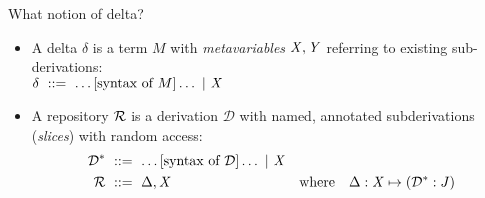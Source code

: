 \documentclass{beamer}
\theoremstyle{example}
\begin{document}
\begin{frame}{What notion of delta?}
  \begin{itemize}
  \item A \textcolor{greenish}{delta} $\delta$ is a term $M$ with
    \emph{metavariables} $\text{\textit{X}}, \text{\textit{Y}}$ referring to existing
    sub-derivations:\\[1em]

    $ \delta \ ::=\  \ldots \text{[syntax of $M$]} \ldots \ |\ 
    \text{\textit{X}} $\\[1em]

  \item A \textcolor{greenish}{repository} $\mathcal{R}$ is a derivation
    $\mathcal D$ with named, annotated subderivations (\emph{slices})
    with random access:
    \begin{align*}
      \mathcal D^* &\ ::=\  \ldots\text{[syntax of $\mathcal D$]}\ldots
      \ |\  \text{\textit{X}} \\
      \mathcal{R} &\ ::=\  \Delta, \text{\textit{X}} &\text{where}\quad\Delta : \text{\textit{X}}\mapsto (\mathcal D^* : J)
    \end{align*}
  \end{itemize}
\end{frame}
\end{document}
